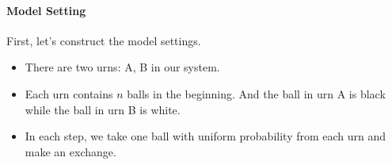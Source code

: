 \documentclass[a4paper, 11pt]{article} %
\begin{document}
\paragraph{Model Setting}
First, let's construct the model settings.
\begin{itemize}
\item There are two urns: A, B in our system.
\item Each urn contains $n$ balls in the beginning. And the ball in urn A is black while the ball in urn B is white.
\item In each step, we take one ball with uniform probability from each urn and make an exchange.
\end{itemize}
\begin{figure}[!h]
\begin{floatrow}
\end{floatrow}
\end{figure}
\end{document}
